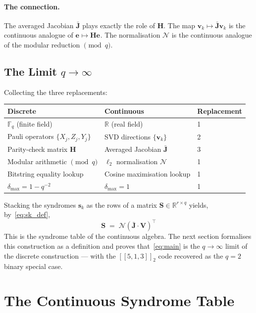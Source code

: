 \documentclass[11pt,a4paper]{article}
\theoremstyle{definition}
\newcommand{\Vm}{\mathbf{V}}
\newcommand{\Sm}{\mathbf{S}}
\newcommand{\Jm}{\mathbf{J}}
\newcommand{\Hm}{\mathbf{H}}
\newcommand{\vk}[1][]{\mathbf{v}_{#1}}
\newcommand{\sk}[1][]{\mathbf{s}_{#1}}
\newcommand{\ek}[1][]{\mathbf{e}_{#1}}
\newcommand{\Rbb}{\mathbb{R}}
\newcommand{\Fbb}{\mathbb{F}}
\newcommand{\Nop}{\mathcal{N}}
\begin{document}
\paragraph{The connection.}
The averaged Jacobian $\bar{\Jm}$ plays exactly the role of $\Hm$. The map $\vk[k]\mapsto \bar{\Jm}\vk[k]$ is the continuous analogue of $\ek\mapsto \Hm\ek$. The normalisation $\Nop$ is the continuous analogue of the modular reduction $\pmod q$.

\subsection{The Limit \texorpdfstring{$q\to\infty$}{q to infinity}}
\label{sec:rep_limit}

Collecting the three replacements:
\begin{center}
\renewcommand{\arraystretch}{1.35}
\begin{tabular}{lll}
\toprule
\textbf{Discrete} & \textbf{Continuous} & \textbf{Replacement} \\
\midrule
$\Fbb_q$ (finite field) & $\Rbb$ (real field) & 1 \\
Pauli operators $\{X_j,Z_j,Y_j\}$ & SVD directions $\{\vk[k]\}$ & 2 \\
Parity-check matrix $\Hm$ & Averaged Jacobian $\bar{\Jm}$ & 3 \\
Modular arithmetic $\pmod q$ & $\ell_2$ normalisation $\Nop$ & 1 \\
Bitstring equality lookup & Cosine maximisation lookup & 1 \\
$\delta_{\max} = 1 - q^{-2}$ & $\delta_{\max} = 1$ & 1 \\
\bottomrule
\end{tabular}
\end{center}

Stacking the syndromes $\sk[k]$ as the rows of a matrix
$\Sm\in\Rbb^{r\times q}$ yields, by~\eqref{eq:sk_def},
\begin{equation}
  \boxed{\;\Sm \;=\; \Nop\!\left(\bar{\Jm}\cdot\Vm\right)^\top\;}
  \label{eq:main}
\end{equation}
This is the syndrome table of the continuous algebra. The next section formalises this construction as a definition and proves that~\eqref{eq:main} is the $q\to\infty$ limit of the discrete construction --- with the $[\![5,1,3]\!]_2$ code recovered as the $q=2$ binary special case.

\section{The Continuous Syndrome Table}
\label{sec:syndrome_table}
\end{document}
